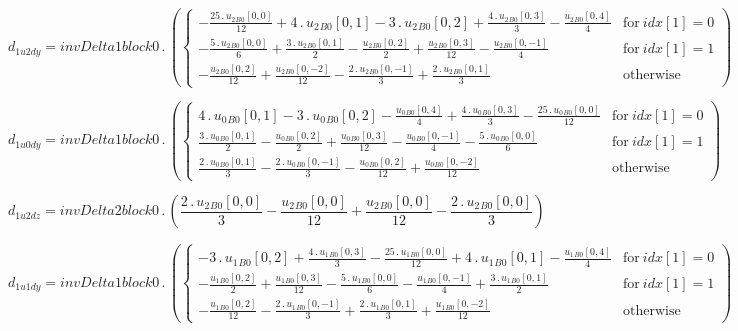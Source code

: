 \documentclass{article}
\begin{document}
\begin{dmath}d_{1 u2 dy} = invDelta1block0 \,.\, \left(\begin{cases} - \frac{25 \,.\, {u_{2}{_{B0}}}[{0,0}]}{12} + 4 \,.\, {u_{2}{_{B0}}}[{0,1}] - 3 \,.\, {u_{2}{_{B0}}}[{0,2}] + \frac{4 \,.\, {u_{2}{_{B0}}}[{0,3}]}{3} - 
\frac{{u_{2}{_{B0}}}[{0,4}]}{4} & \text{for}\: {idx}[{1}] = 0 \\- \frac{5 \,.\, {u_{2}{_{B0}}}[{0,0}]}{6} + \frac{3 \,.\, {u_{2}{_{B0}}}[{0,1}]}{2} - \frac{{u_{2}{_{B0}}}[{0,2}]}{2} + \frac{{u_{2}{_{B0}}}[{0,3}]}{12} - 
\frac{{u_{2}{_{B0}}}[{0,-1}]}{4} & \text{for}\: {idx}[{1}] = 1 \\- \frac{{u_{2}{_{B0}}}[{0,2}]}{12} + \frac{{u_{2}{_{B0}}}[{0,-2}]}{12} - \frac{2 \,.\, {u_{2}{_{B0}}}[{0,-1}]}{3} + \frac{2 \,.\, {u_{2}{_{B0}}}[{0,1}]}{3} & \text{otherwise} 
\end{cases}\right)\end{dmath}

\begin{dmath}d_{1 u0 dy} = invDelta1block0 \,.\, \left(\begin{cases} 4 \,.\, {u_{0}{_{B0}}}[{0,1}] - 3 \,.\, {u_{0}{_{B0}}}[{0,2}] - \frac{{u_{0}{_{B0}}}[{0,4}]}{4} + \frac{4 \,.\, {u_{0}{_{B0}}}[{0,3}]}{3} - \frac{25 \,.\, {u_{0}{_{B0}}}[{0,0}]}{12} 
& \text{for}\: {idx}[{1}] = 0 \\\frac{3 \,.\, {u_{0}{_{B0}}}[{0,1}]}{2} - \frac{{u_{0}{_{B0}}}[{0,2}]}{2} + \frac{{u_{0}{_{B0}}}[{0,3}]}{12} - \frac{{u_{0}{_{B0}}}[{0,-1}]}{4} - \frac{5 \,.\, {u_{0}{_{B0}}}[{0,0}]}{6} & \text{for}\: {idx}[{1}] = 1 
\\\frac{2 \,.\, {u_{0}{_{B0}}}[{0,1}]}{3} - \frac{2 \,.\, {u_{0}{_{B0}}}[{0,-1}]}{3} - \frac{{u_{0}{_{B0}}}[{0,2}]}{12} + \frac{{u_{0}{_{B0}}}[{0,-2}]}{12} & \text{otherwise} \end{cases}\right)\end{dmath}

\begin{dmath}d_{1 u2 dz} = invDelta2block0 \,.\, \left(\frac{2 \,.\, {u_{2}{_{B0}}}[{0,0}]}{3} - \frac{{u_{2}{_{B0}}}[{0,0}]}{12} + \frac{{u_{2}{_{B0}}}[{0,0}]}{12} - \frac{2 \,.\, {u_{2}{_{B0}}}[{0,0}]}{3}\right)\end{dmath}

\begin{dmath}d_{1 u1 dy} = invDelta1block0 \,.\, \left(\begin{cases} - 3 \,.\, {u_{1}{_{B0}}}[{0,2}] + \frac{4 \,.\, {u_{1}{_{B0}}}[{0,3}]}{3} - \frac{25 \,.\, {u_{1}{_{B0}}}[{0,0}]}{12} + 4 \,.\, {u_{1}{_{B0}}}[{0,1}] - 
\frac{{u_{1}{_{B0}}}[{0,4}]}{4} & \text{for}\: {idx}[{1}] = 0 \\- \frac{{u_{1}{_{B0}}}[{0,2}]}{2} + \frac{{u_{1}{_{B0}}}[{0,3}]}{12} - \frac{5 \,.\, {u_{1}{_{B0}}}[{0,0}]}{6} - \frac{{u_{1}{_{B0}}}[{0,-1}]}{4} + \frac{3 \,.\, 
{u_{1}{_{B0}}}[{0,1}]}{2} & \text{for}\: {idx}[{1}] = 1 \\- \frac{{u_{1}{_{B0}}}[{0,2}]}{12} - \frac{2 \,.\, {u_{1}{_{B0}}}[{0,-1}]}{3} + \frac{2 \,.\, {u_{1}{_{B0}}}[{0,1}]}{3} + \frac{{u_{1}{_{B0}}}[{0,-2}]}{12} & \text{otherwise} 
\end{cases}\right)\end{dmath}
\end{document}
